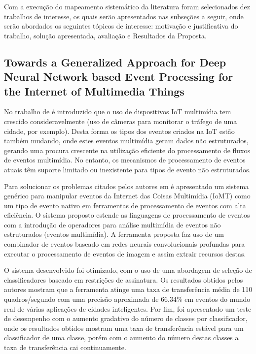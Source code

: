 \documentclass[ti,table]{texufpel} %
\begin{document}
Com a execução do mapeamento sistemático da literatura foram selecionados dez trabalhos de interesse, os quais serão apresentados nas subseções a seguir, onde serão abordados os seguintes tópicos de interesse: motivação e justificativa do trabalho, solução apresentada, avaliação e Resultados da Proposta. 

  

  


\subsection{Towards a Generalized Approach for Deep Neural Network based Event Processing for the Internet of Multimedia Things} 

  

  

    No trabalho de \cite{art1aslam2018towards} é introduzido que o uso de dispositivos IoT multimídia tem crescido consideravelmente (uso de câmeras para monitorar o tráfego de uma cidade, por exemplo). Desta forma os tipos dos eventos criados na IoT estão também mudando, onde estes eventos multimídia geram dados não estruturados, gerando uma procura crescente na utilização eficiente do processamento de fluxos de eventos multimídia. No entanto, os mecanismos de processamento de eventos atuais têm suporte limitado ou inexistente para tipos de evento não estruturados. 

     

    Para solucionar os problemas citados pelos autores em \cite{art1aslam2018towards} é apresentado um sistema genérico para manipular eventos da Internet das Coisas Multimídia (IoMT) como um tipo de evento nativo em ferramentas de processamento de eventos com alta eficiência. O sistema proposto estende as linguagens de processamento de eventos com a introdução de operadores para análise multimídia de eventos não estruturados (eventos multimídia). A ferramenta proposta faz uso de um combinador de eventos baseado em redes neurais convolucionais profundas para executar o processamento de eventos de imagem e assim extrair recursos destas. 

     

     O sistema desenvolvido foi otimizado, com o uso de uma abordagem de seleção de classificadores baseado em restrições de assinatura. Os resultados obtidos pelos autores mostram que a ferramenta atinge uma taxa de transferência média de 110 quadros/segundo com uma precisão aproximada de 66,34\% em eventos do mundo real de várias aplicações de cidades inteligentes. Por fim, foi apresentado um teste de desempenho com o aumento gradativo do número de classes por classificador, onde os resultados obtidos mostram uma taxa de transferência estável para um classificador de uma classe, porém com o aumento do número destas classes a taxa de transferência cai continuamente.   
\end{document}

